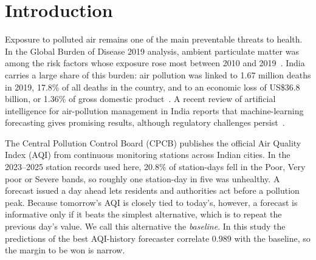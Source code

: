 \documentclass[pdflatex,sn-mathphys-num]{sn-jnl}
\begin{document}


\maketitle

\section{Introduction}\label{sec:intro}

Exposure to polluted air remains one of the main preventable threats to health. In the Global Burden of Disease 2019 analysis, ambient particulate matter was among the risk factors whose exposure rose most between 2010 and 2019~\cite{gbd}. India carries a large share of this burden: air pollution was linked to 1.67 million deaths in 2019, 17.8\% of all deaths in the country, and to an economic loss of US\$36.8 billion, or 1.36\% of gross domestic product~\cite{pandey}. A recent review of artificial intelligence for air-pollution management in India reports that machine-learning forecasting gives promising results, although regulatory challenges persist~\cite{rautela}.

The Central Pollution Control Board (CPCB) publishes the official Air Quality Index (AQI) from continuous monitoring stations across Indian cities. In the 2023--2025 station records used here, 20.8\% of station-days fell in the Poor, Very poor or Severe bands, so roughly one station-day in five was unhealthy. A forecast issued a day ahead lets residents and authorities act before a pollution peak. Because tomorrow's AQI is closely tied to today's, however, a forecast is informative only if it beats the simplest alternative, which is to repeat the previous day's value. We call this alternative the \emph{baseline}. In this study the predictions of the best AQI-history forecaster correlate $0.989$ with the baseline, so the margin to be won is narrow.
\end{document}
